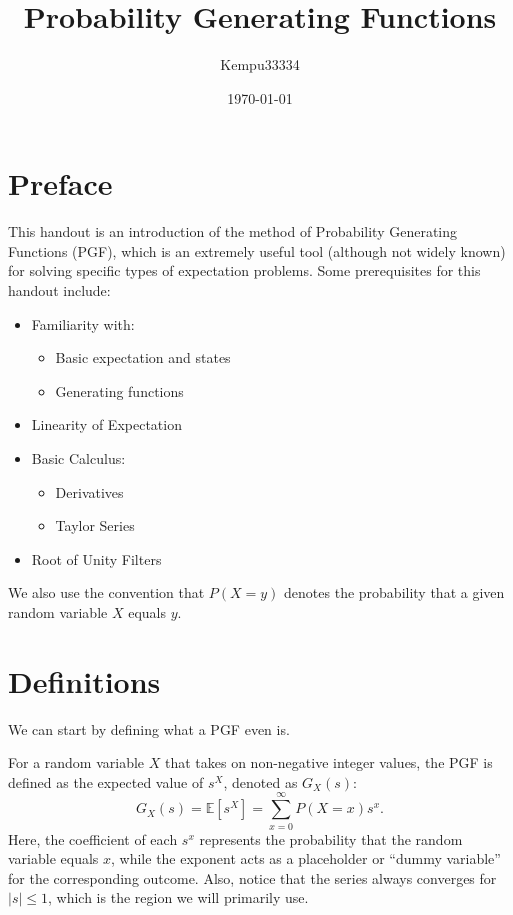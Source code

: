 \documentclass[11pt]{scrartcl}
\title{Probability Generating Functions}
\author{\LARGE Kempu33334}
\date{\large \today}
\begin{document}
\maketitle

\tableofcontents

\section{Preface}

This handout is an introduction of the method of Probability Generating Functions (PGF), which is an extremely useful tool (although not widely known) for solving specific types of expectation problems. Some prerequisites for this handout include:

\begin{itemize}
\item Familiarity with:
\begin{itemize}
\item Basic expectation and states
\item Generating functions
\end{itemize}
\item Linearity of Expectation
\item Basic Calculus:
\begin{itemize}
\item Derivatives
\item Taylor Series
\end{itemize}
\item Root of Unity Filters
\end{itemize}

We also use the convention that $P(X = y)$ denotes the probability that a given random variable $X$ equals $y$.

\section{Definitions}

We can start by defining what a PGF even is.

\begin{definition*}
For a random variable $X$ that takes on non-negative integer values, the PGF is defined as the expected value of $s^X$, denoted as $G_X(s)$: \[G_X(s) = \mathbb{E}[s^X] = \sum_{x=0}^{\infty} P(X=x)s^x.\] Here, the coefficient of each $s^x$ represents the probability that the random variable equals $x$, while the exponent acts as a placeholder or ``dummy variable'' for the corresponding outcome. Also, notice that the series always converges for $|s|\le1$,
which is the region we will primarily use.
\end{definition*}
\end{document}
